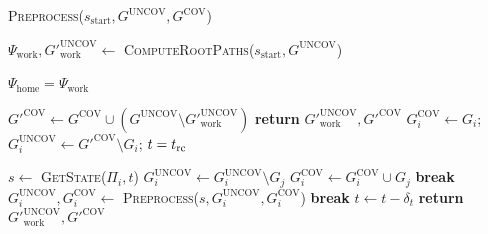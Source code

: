 \documentclass[conference]{IEEEtran}
\begin{document}
\begin{algorithm}
\caption{\textsc{Preprocess}($s_{\textrm{start}},G^{\textrm{UNCOV}},G^{\textrm{COV}}$)}\label{alg:2}
\begin{algorithmic}[1]
\State $\Psi_{\textrm{work}}, G'^{\textrm{UNCOV}}_{\textrm{work}} \leftarrow$ \textsc{ComputeRootPaths}($s_{\textrm{start}},G^{\textrm{UNCOV}}$)

    \State $\Psi_{\textrm{home}} = \Psi_{\textrm{work}}$
\EndIf

\State $G'^{\textrm{COV}} \leftarrow G^{\textrm{COV}} \cup (G^{\textrm{UNCOV}} \setminus G'^{\textrm{UNCOV}}_{\textrm{work}})$
    \State \textbf{return} $G'^{\textrm{UNCOV}}_{\textrm{work}}, G'^{\textrm{COV}}$
\EndIf
{}
    \State $G_i^{\textrm{COV}} \leftarrow G_i$;
            \hspace{2mm}
           $G_i^{\textrm{UNCOV}} \leftarrow G'^{\textrm{COV}} \setminus G_i$;
            \hspace{2mm}
           $t = t_{\textrm{rc}}$

        \State $s \leftarrow$ \textsc{GetState($\Pi_i, t$)}
                \State $G_i^{\textrm{UNCOV}} \leftarrow G_i^{\textrm{UNCOV}} \setminus G_j$
                \State $G_i^{\textrm{COV}} \leftarrow G_i^{\textrm{COV}} \cup G_j$
            \EndIf
        \EndFor
            \State \textbf{break}
        \EndIf
        \State $G_i^{\textrm{UNCOV}},G_i^{\textrm{COV}} \leftarrow$ \textsc{Preprocess}($s,G_i^{\textrm{UNCOV}},G_i^{\textrm{COV}}$)
            \State \textbf{break}
        \EndIf
        \State $t \leftarrow t - \delta_t$
    \EndWhile
\EndFor
\State \textbf{return} $G'^{\textrm{UNCOV}}_{\textrm{work}}, G'^{\textrm{COV}}$

\end{algorithmic}
\end{algorithm}

\end{document}
